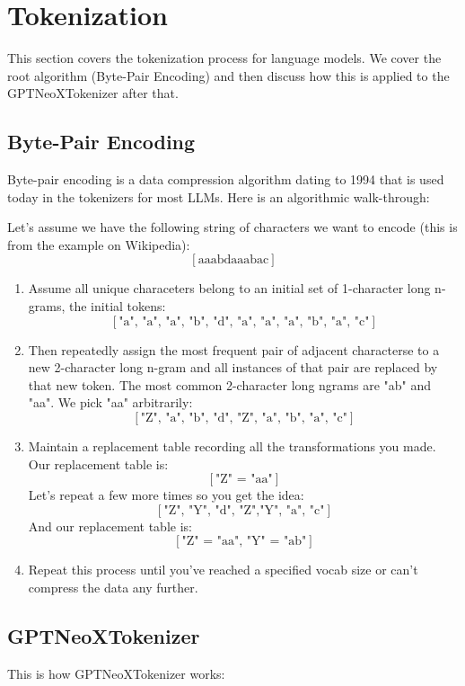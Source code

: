 \documentclass[12pt]{article}
\begin{document}
\section{Tokenization}
This section covers the tokenization process for language models. We cover the root algorithm (Byte-Pair Encoding) and then discuss how this is applied to the GPTNeoXTokenizer after that. 
\subsection{Byte-Pair Encoding}
Byte-pair encoding is a data compression algorithm dating to 1994 that is used today in the tokenizers for most LLMs. Here is an algorithmic walk-through:

Let's assume we have the following string of characters we want to encode (this is from the example on Wikipedia): 
\[[\text{aaabdaaabac}]\]
\begin{enumerate}
\item Assume all unique characeters belong to an initial set of 1-character long n-grams, the initial tokens: \\
\[[\text{"a", "a", "a", "b", "d", "a", "a", "a", "b", "a", "c"}]\]
\item Then repeatedly assign the most frequent pair of adjacent characterse to a new 2-character long n-gram and all instances of that pair are replaced by that new token. The most common 2-character long ngrams are "ab" and "aa". We pick "aa" arbitrarily: \\
\[[\text{"Z", "a", "b", "d", "Z", "a", "b", "a", "c"}]\]
\item Maintain a replacement table recording all the transformations you made. Our replacement table is:
\[[\text{"Z"  = "aa"}]\]
Let's repeat a few more times so you get the idea:
\[[\text{"Z", "Y", "d", "Z","Y", "a", "c"}]\]
And our replacement table is:
\[[\text{"Z"  = "aa", "Y" = "ab"}]\]
\item Repeat this process until you've reached a specified vocab size or can't compress the data any further. 
\end{enumerate}
\subsection{GPTNeoXTokenizer}
This is how GPTNeoXTokenizer works:
\end{document}

